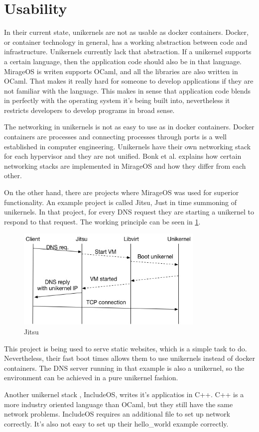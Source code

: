 \section{Usability}
In their current state, unikernels are not as usable as docker containers. Docker, or container technology in general, has a working abstraction between code and infrastructure. Unikernels currently lack that abstraction. If a unikernel supports a certain language, then the application code should also be in that language. MirageOS is writen supports OCaml, and all the libraries are also written in OCaml. That makes it really hard for someone to develop applications if they are not familiar with the language. This makes in sense that application code blends in perfectly with the operating system it's being built into, nevertheless it restricts developers to develop programs in broad sense.

The networking in unikernels is not as easy to use as in docker containers. Docker containers are processes and connecting processes through ports is a well established in computer engineering. Unikernels have their own networking stack for each hypervisor and they are not unified. Bonk et al. \cite{Bonk} explains how certain networking stacks are implemented in MirageOS and how they differ from each other.

On the other hand, there are projects where MirageOS was used for superior functionality. An example project is called Jitsu\cite{jitsu}, Just in time summoning of unikernels. In that project, for every DNS request they are starting a unikernel to respond to that request. The working principle can be seen in \ref{fig:jitsu}.

\begin{figure}[htpb]
    \centering
    \includegraphics[width=0.8\textwidth]{figures/jitsu.jpg}
    \caption{Jitsu \cite{jitsu}} \label{fig:jitsu}
  \end{figure}

This project is being used to serve static websites, which is a simple task to do. Nevertheless, their fast boot times allows them to use unikernels instead of docker containers. The DNS server running in that example is also a unikernel, so the environment can be achieved in a pure unikernel fashion.

Another unikernel stack , IncludeOS, writes it's applicatios in C++. C++ is a more industry oriented language than OCaml, but they still have the same network problems. IncludeOS requires an additional file to set up network correctly. It's also not easy to set up their hello\_world example correctly.